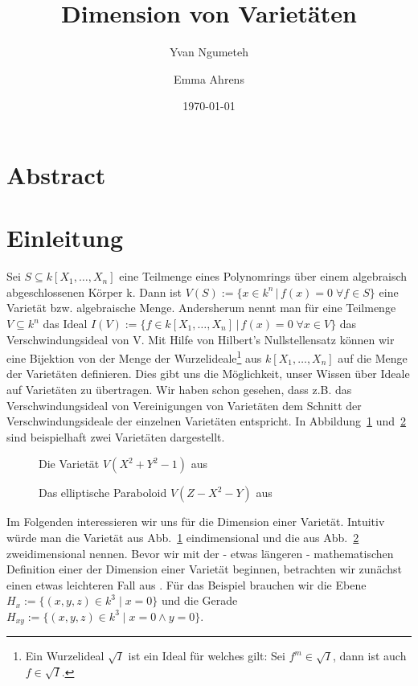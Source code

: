 \documentclass{article}
\title{Dimension von Varietäten}
\date{\today}
\author{Yvan Ngumeteh \and Emma Ahrens}
\newcommand*{\R}{k[X_{1},\ldots,X_{n}]}
\begin{document}
\maketitle

\section{Abstract}
\section{Einleitung}
	
	Sei \(S \subseteq \R\) eine Teilmenge eines Polynomrings über einem algebraisch abgeschlossenen
	Körper k. Dann ist \(V(S) := \{x \in k^n\,|\, f(x)=0\; \forall f \in S\}\) eine Varietät bzw.
	algebraische Menge. Andersherum nennt man für eine Teilmenge \(V \subseteq k^{n}\) das 
	Ideal \(I(V) := \{f \in \R\,|\, f(x)=0\; \forall x\in V\}\) das Verschwindungsideal von V.
	Mit Hilfe von Hilbert's Nullstellensatz können wir eine Bijektion von
	der Menge der Wurzelideale\footnote{Ein Wurzelideal \(\sqrt{I}\) ist ein Ideal für welches gilt: Sei \(f^{m} \in \sqrt{I}\), dann ist auch \(f \in \sqrt{I}\).} aus \(\R\) auf die Menge der Varietäten definieren. Dies gibt uns
	die Möglichkeit, unser Wissen über Ideale auf Varietäten zu übertragen. Wir haben schon
	gesehen, dass z.B. das Verschwindungsideal von Vereinigungen von Varietäten dem Schnitt der
	Verschwindungsideale der einzelnen Varietäten entspricht.
	In Abbildung~\ref{circle} und~\ref{paraboloid} sind beispielhaft zwei Varietäten dargestellt.

	\begin{figure}[ht]
		\centering
		\caption{Die Varietät \(V(X^2 + Y^2 -1)\) aus \cite{CLOS}}
		\label{circle}
	\end{figure}

	\begin{figure}[ht]
		\centering
		\caption{Das elliptische Paraboloid \(V(Z - X^2 -Y)\) aus \cite{CLOS}}
		\label{paraboloid}
	\end{figure}

	Im Folgenden interessieren wir uns für die Dimension einer Varietät. Intuitiv würde man
	die Varietät aus Abb.~\ref{circle} eindimensional und die aus Abb.~\ref{paraboloid}
	zweidimensional nennen. Bevor wir mit der - etwas längeren - mathematischen Definition einer
	der Dimension einer Varietät beginnen, betrachten wir zunächst einen etwas leichteren Fall 
	aus \cite{CLOS}.
	Für das Beispiel brauchen wir die Ebene \(H_x := \{(x,y,z) \in k^3\;|\; x = 0\}\) und die
	Gerade \(H_{xy} := \{(x,y,z) \in k^3\;|\; x=0 \wedge y=0\}\).
\end{document}
